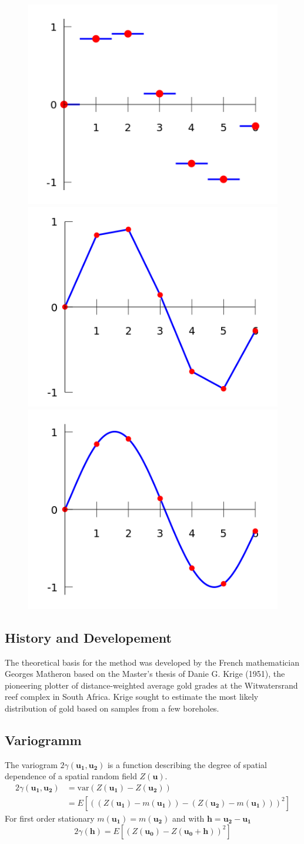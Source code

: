 \documentclass[twocolumn]{article}
\numberwithin{equation}{section}
\begin{document}
\begin{figure}[H]
	\centering
	\includegraphics[width=.15\textwidth]{Images/440px-Piecewise_constant.png}
	\includegraphics[width=.15\textwidth]{Images/460px-Interpolation_example_linear.png}
	\includegraphics[width=.15\textwidth]{Images/460px-Interpolation_example_polynomial.png}
\end{figure}

\subsection{History and Developement}
The theoretical basis for the method was developed by the French mathematician Georges Matheron based on the Master's thesis of Danie G. Krige (1951), the pioneering plotter of distance-weighted average gold grades at the Witwatersrand reef complex in South Africa. Krige sought to estimate the most likely distribution of gold based on samples from a few boreholes.


\subsection{Variogramm}
The variogram $2\gamma(\boldsymbol{u_1},\boldsymbol{u_2})$ is a function describing the degree of spatial dependence of a spatial random field $Z(\boldsymbol{u})$.
\begin{align*}
2\gamma(\boldsymbol{u_1},\boldsymbol{u_2}) 	&=\text{var} \left(Z(\boldsymbol{u_1}) - Z(\boldsymbol{u_2})\right) \\
  											&= E\left[((Z(\boldsymbol{u_1})-m(\boldsymbol{u_1}))-(Z(\boldsymbol{u_2}) - m(\boldsymbol{u_1})))^2\right]
\end{align*}
For first order stationary $m(\boldsymbol{u_1})=m(\boldsymbol{u_2})$ and with $\boldsymbol{h}=\boldsymbol{u_2}-\boldsymbol{u_1}$
$$2\gamma(\boldsymbol{h}) =E\left[(Z(\boldsymbol{u_0})-Z(\boldsymbol{u_0+h} ))^2\right]$$
\end{document}
